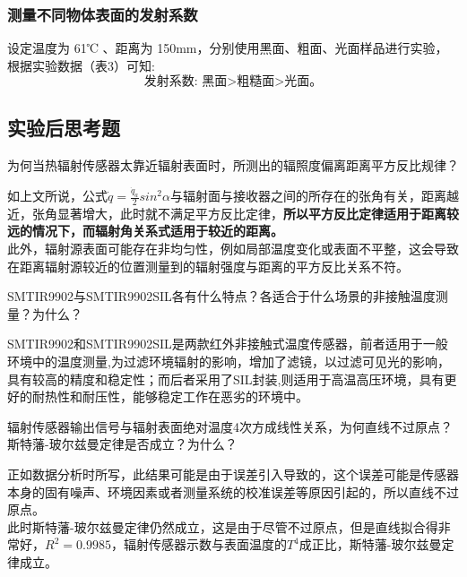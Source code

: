 \documentclass[dvipsnames, svgnames,a4paper,11pt]{article}
\begin{document}
	\subsubsection{测量不同物体表面的发射系数}
	设定温度为 61℃ 、距离为 150mm，分别使用黑面、粗面、光面样品进行实验，根据实验数据（表3）可知:
	$$\text{发射系数: 黑面>粗糙面>光面。}$$
	
	
	\subsection{实验后思考题}
	
	\begin{question}
		为何当热辐射传感器太靠近辐射表面时，所测出的辐照度偏离距离平方反比规律？
	\end{question}
	如上文所说，公式$\dot{q}=\frac{\dot{q}_a}2sin^2\alpha $与辐射面与接收器之间的所存在的张角有关，距离越近，张角显著增大，此时就不满足平方反比定律，\textbf{所以平方反比定律适用于距离较远的情况下，而辐射角关系式适用于较近的距离。}\\
	\indent 此外，辐射源表面可能存在非均匀性，例如局部温度变化或表面不平整，这会导致在距离辐射源较近的位置测量到的辐射强度与距离的平方反比关系不符。
	
	\begin{question}
	SMTIR9902与SMTIR9902SIL各有什么特点？各适合于什么场景的非接触温度测量？为什么？
	\end{question}
	SMTIR9902和SMTIR9902SIL是两款红外非接触式温度传感器，前者适用于一般环境中的温度测量,为过滤环境辐射的影响，增加了滤镜，以过滤可见光的影响，具有较高的精度和稳定性；而后者采用了SIL封装,则适用于高温高压环境，具有更好的耐热性和耐压性，能够稳定工作在恶劣的环境中。
	\begin{question}
	辐射传感器输出信号与辐射表面绝对温度4次方成线性关系，为何直线不过原点？斯特藩-玻尔兹曼定律是否成立？为什么？
	\end{question}
	正如数据分析时所写，此结果可能是由于误差引入导致的，这个误差可能是传感器本身的固有噪声、环境因素或者测量系统的校准误差等原因引起的，所以直线不过原点。\\
	\indent 此时斯特藩-玻尔兹曼定律仍然成立，这是由于尽管不过原点，但是直线拟合得非常好，$R^{2}=0.9985$，辐射传感器示数与表面温度的$T^4$成正比，斯特藩-玻尔兹曼定律成立。
	
\end{document}
